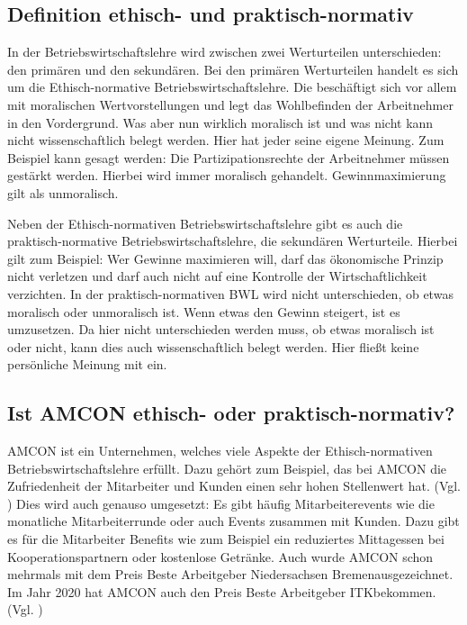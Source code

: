     \subsection{Definition ethisch- und praktisch-normativ}
        In der Betriebswirtschaftslehre wird zwischen zwei Werturteilen unterschieden: den primären und den sekundären.
        Bei den primären Werturteilen handelt es sich um die Ethisch-normative Betriebswirtschaftslehre. Die beschäftigt
        sich vor allem mit moralischen Wertvorstellungen und legt das Wohlbefinden der Arbeitnehmer in den Vordergrund.
        Was aber nun wirklich moralisch ist und was nicht kann nicht wissenschaftlich belegt werden. Hier hat jeder 
        seine eigene Meinung. Zum Beispiel kann gesagt werden: Die Partizipationsrechte der Arbeitnehmer müssen gestärkt
        werden. Hierbei wird immer moralisch gehandelt. Gewinnmaximierung gilt als unmoralisch.

        Neben der Ethisch-normativen Betriebswirtschaftslehre gibt es auch die praktisch-normative 
        Betriebswirtschaftslehre, die sekundären Werturteile. Hierbei gilt zum Beispiel: Wer Gewinne maximieren will,
        darf das ökonomische Prinzip nicht verletzen und darf auch nicht auf eine Kontrolle der Wirtschaftlichkeit 
        verzichten. In der praktisch-normativen BWL wird nicht unterschieden, ob etwas moralisch oder unmoralisch ist.
        Wenn etwas den Gewinn steigert, ist es umzusetzen. Da hier nicht unterschieden werden muss, ob etwas moralisch 
        ist oder nicht, kann dies auch wissenschaftlich belegt werden. Hier fließt keine persönliche Meinung mit ein.

    \subsection{Ist AMCON ethisch- oder praktisch-normativ?}
        AMCON ist ein Unternehmen, welches viele Aspekte der Ethisch-normativen Betriebswirtschaftslehre erfüllt. Dazu
        gehört zum Beispiel, das bei AMCON die Zufriedenheit der Mitarbeiter und Kunden einen sehr hohen Stellenwert
        hat. (Vgl. \cite{AMC22c}) Dies wird auch genauso umgesetzt: Es gibt häufig Mitarbeiterevents wie die monatliche 
        Mitarbeiterrunde oder auch Events zusammen mit Kunden. Dazu gibt es für die Mitarbeiter Benefits wie zum 
        Beispiel ein reduziertes Mittagessen bei Kooperationspartnern oder kostenlose Getränke. Auch wurde AMCON schon 
        mehrmals mit dem Preis \as Beste Arbeitgeber Niedersachsen Bremen\adl ausgezeichnet. Im Jahr 2020 hat AMCON auch 
        den Preis \as Beste Arbeitgeber ITK\adl bekommen. (Vgl. \cite{AMC22B})

